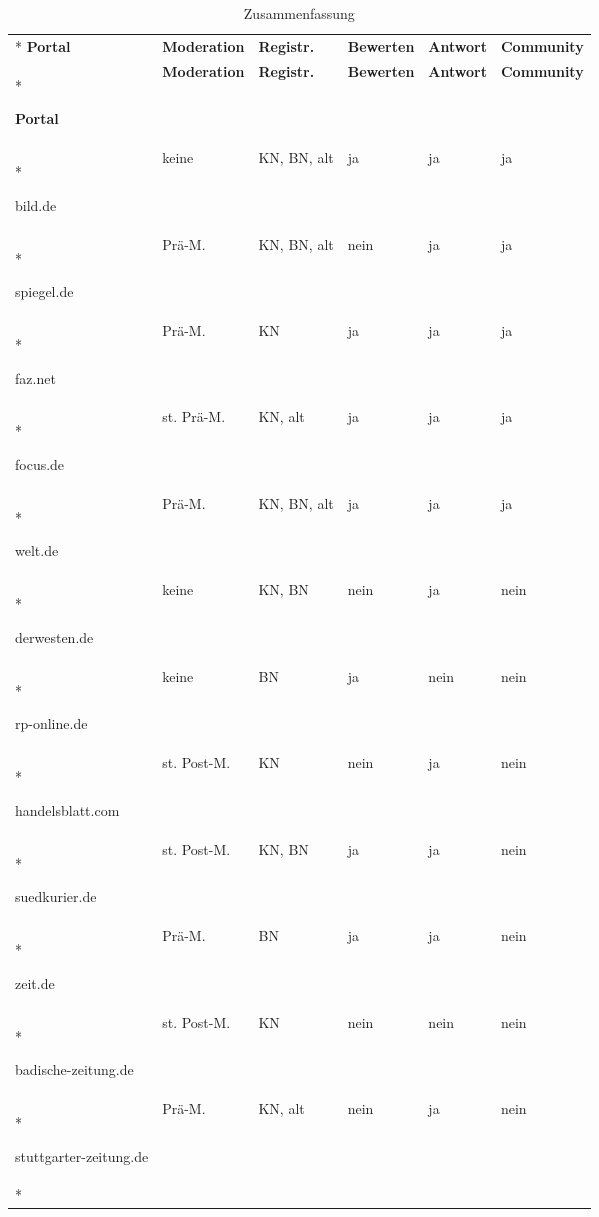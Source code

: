 \begingroup
  \footnotesize
  \begin{longtable}{p{28mm}*{5}{l}}

    \caption{Zusammenfassung} \\*
    \toprule
    \bfseries Portal & \bfseries Moderation & \bfseries Registr. & \bfseries Bewerten & \bfseries Antwort
    & \bfseries Community\\*\toprule
    \endfirsthead

    \toprule
    \bfseries Portal & \bfseries Moderation & \bfseries Registr. & \bfseries Bewerten & \bfseries Antwort
    & \bfseries Community\\*\toprule
    \endhead

    \multicolumn{6}{r}{\emph{Fortsetzung auf der nächsten Seite}}
    \endfoot

    \bottomrule
    \endlastfoot

bild.de
& keine
& KN, BN, alt
& ja
& ja
& ja
\\*\midrule

spiegel.de
& Prä-M.
& KN, BN, alt
& nein
& ja
& ja
\\*\midrule

faz.net
& Prä-M.
& KN
& ja
& ja
& ja
\\*\midrule

focus.de
& st. Prä-M.
& KN, alt
& ja
& ja
& ja
\\*\midrule

welt.de
& Prä-M.
& KN, BN, alt
& ja
& ja
& ja
\\*\midrule

derwesten.de
& keine
& KN, BN
& nein
& ja
& nein
\\*\midrule

rp-online.de
& keine
& BN
& ja
& nein
& nein
\\*\midrule

handelsblatt.com
& st. Post-M.
& KN
& nein
& ja
& nein
\\*\midrule

suedkurier.de
& st. Post-M.
& KN, BN
& ja
& ja
& nein
\\*\midrule

zeit.de
& Prä-M.
& BN
& ja
& ja
& nein
\\*\midrule

badische-zeitung.de
& st. Post-M.
& KN
&nein
&nein
& nein
\\*\midrule

stuttgarter-zeitung.de
& Prä-M.
& KN, alt
& nein
& ja
& nein
\\*\midrule


\end{longtable}
